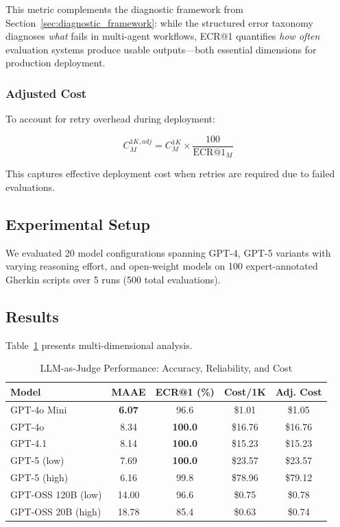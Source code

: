 This metric complements the diagnostic framework from Section~\ref{sec:diagnostic_framework}: while the structured error taxonomy diagnoses \textit{what} fails in multi-agent workflows, ECR@1 quantifies \textit{how often} evaluation systems produce usable outputs---both essential dimensions for production deployment.

\subsubsection{Adjusted Cost}

To account for retry overhead during deployment:

\begin{equation}
C^{1K,adj}_M = C^{1K}_M \times \frac{100}{\text{ECR@1}_M}
\end{equation}

This captures effective deployment cost when retries are required due to failed evaluations.

\subsection{Experimental Setup}

We evaluated 20 model configurations spanning GPT-4, GPT-5 variants with varying reasoning effort, and open-weight models on 100 expert-annotated Gherkin scripts over 5 runs (500 total evaluations).

\subsection{Results}

Table~\ref{tab:laj_results} presents multi-dimensional analysis.

\begin{table}[htbp]
\centering
\caption{LLM-as-Judge Performance: Accuracy, Reliability, and Cost}
\label{tab:laj_results}
\begin{tabular}{@{}lcccc@{}}
\toprule
\textbf{Model} & \textbf{MAAE} & \textbf{ECR@1 (\%)} & \textbf{Cost/1K} & \textbf{Adj. Cost} \\
\midrule
GPT-4o Mini & \textbf{6.07} & 96.6 & \$1.01 & \$1.05 \\
GPT-4o & 8.34 & \textbf{100.0} & \$16.76 & \$16.76 \\
GPT-4.1 & 8.14 & \textbf{100.0} & \$15.23 & \$15.23 \\
GPT-5 (low) & 7.69 & \textbf{100.0} & \$23.57 & \$23.57 \\
GPT-5 (high) & 6.16 & 99.8 & \$78.96 & \$79.12 \\
GPT-OSS 120B (low) & 14.00 & 96.6 & \$0.75 & \$0.78 \\
GPT-OSS 20B (high) & 18.78 & 85.4 & \$0.63 & \$0.74 \\
\bottomrule
\end{tabular}
\end{table}

